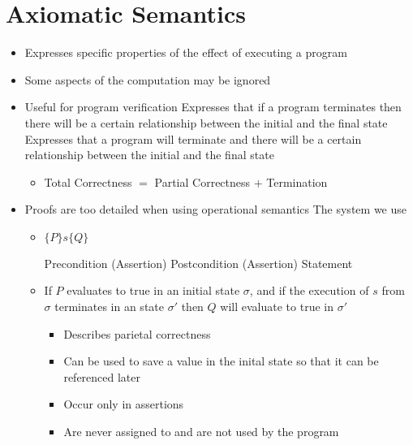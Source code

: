 
\section{Axiomatic Semantics}
\begin{itemize}
    \item Expresses specific properties of the effect of executing a program
    \item Some aspects of the computation may be ignored
    \item Useful for program verification
     Expresses that if a program terminates then there will be a certain relationship between the initial and the final state
     Expresses that a program will terminate and there will be a certain relationship between the initial and the final state
        \begin{itemize}
            \item Total Correctness $=$ Partial Correctness $+$ Termination
        \end{itemize}
    \item Proofs are too detailed when using operational semantics
     The system we use
        \begin{itemize}
            \item $\{ P \} s \{ Q \}$
                \begin{itemize}
                     Precondition (Assertion)
                     Postcondition (Assertion)
                     Statement
                \end{itemize}
            \item If $P$ evaluates to true in an initial state $\sigma$, and if the execution of $s$ from $\sigma$ terminates in an state $\sigma'$ then $Q$ will evaluate to true in $\sigma'$
                \begin{itemize}
                    \item Describes parietal correctness
                \end{itemize}
                \begin{itemize}
                    \item Can be used to save a value in the inital state so that it can be referenced later
                    \item Occur only in assertions
                    \item Are never assigned to and are not used by the program

\end{itemize}
\end{itemize}
\end{itemize}
